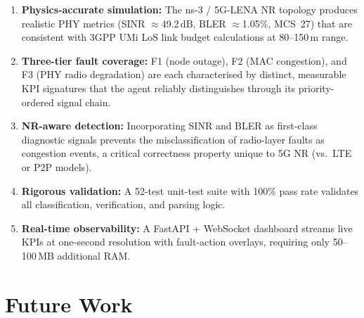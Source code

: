 \documentclass[12pt,a4paper]{article}
\begin{document}
\begin{enumerate}[noitemsep]
  \item \textbf{Physics-accurate simulation:} The ns-3 / 5G-LENA NR topology
    produces realistic PHY metrics (SINR $\approx$49.2\,dB, BLER $\approx$1.05\%,
    MCS~27) that are consistent with 3GPP UMi LoS link budget calculations at
    80--150\,m range.
  \item \textbf{Three-tier fault coverage:} F1 (node outage), F2 (MAC
    congestion), and F3 (PHY radio degradation) are each characterised by
    distinct, measurable KPI signatures that the agent reliably distinguishes
    through its priority-ordered signal chain.
  \item \textbf{NR-aware detection:} Incorporating SINR and BLER as first-class
    diagnostic signals prevents the misclassification of radio-layer faults as
    congestion events, a critical correctness property unique to 5G NR
    (vs.\ LTE or P2P models).
  \item \textbf{Rigorous validation:} A 52-test unit-test suite with 100\%
    pass rate validates all classification, verification, and parsing logic.
  \item \textbf{Real-time observability:} A FastAPI + WebSocket dashboard
    streams live KPIs at one-second resolution with fault-action overlays,
    requiring only 50--100\,MB additional RAM.
\end{enumerate}

\section{Future Work}
\end{document}

